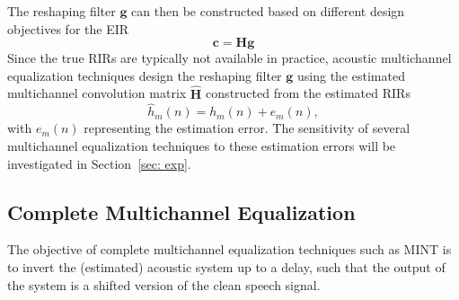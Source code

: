 \documentclass[10pt]{IEEEtran}
\begin{document}
The reshaping filter $\mathbf{g}$ can then be constructed based on different design objectives for the EIR
\begin{equation}
\boxed{\mathbf{c} = \mathbf{H}\mathbf{g}}
\end{equation}
Since the true RIRs are typically not available in practice, acoustic multichannel equalization techniques design the reshaping filter $\mathbf{g}$ using the estimated multichannel convolution matrix $\hat{\mathbf{H}}$ constructed from the estimated RIRs
\begin{equation}
\label{eq: hath}
\hat{h}_m(n) = h_m(n) + e_m(n),
\end{equation}
with $e_m(n)$ representing the estimation error.
The sensitivity of several multichannel equalization techniques to these estimation errors will be investigated in Section~\ref{sec: exp}.


\subsection{Complete Multichannel Equalization}
\label{subsec: mint}
The objective of complete multichannel equalization techniques such as MINT is to invert the (estimated) acoustic system up to a delay, such that the output of the system is a shifted version of the clean speech signal.
\end{document}
